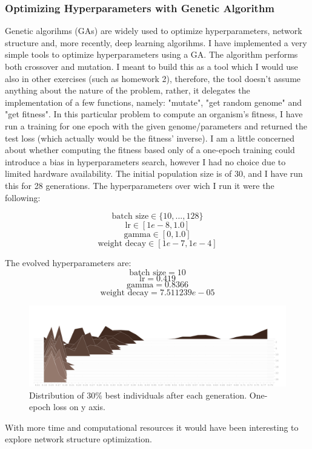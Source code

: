 \documentclass{article}
\begin{document}
\subsubsection{Optimizing Hyperparameters with Genetic Algorithm}
Genetic algorihms (GAs) are widely used to optimize hyperparameters, network structure and, more recently, deep learning algorihms. I have implemented a very simple tools to optimize hyperparameters using a GA. The algorithm performs both crossover and mutation. I meant to build this as a tool which I would use also in other exercises (such as homework 2), therefore, the tool doesn't assume anything about the nature of the problem, rather, it delegates the implementation of a few functions, namely: "mutate", "get random genome" and "get fitness". In this particular problem to compute an organism's fitness, I have run a training for one epoch with the given genome/parameters and returned the test loss (which actually would be the fitness' inverse). I am a little concerned about whether computing the fitness based only of a one-epoch training could introduce a bias in hyperparameters search, however I had no choice due to limited hardware availability.
The initial population size is of 30, and I have run this for 28 generations. The hyperparameters over wich I run it were the following:

$$
\textrm{batch size} \in \{10,...,128\}
$$
$$
\textrm{lr} \in [1e-8, 1.0]
$$
$$
\textrm{gamma} \in [0, 1.0]
$$
$$
\textrm{weight decay} \in [1e-7, 1e-4]
$$

The evolved hyperparameters are:
$$
\textrm{batch size} = 10
$$
$$
\textrm{lr} = 0.419
$$
$$
\textrm{gamma} =  0.8366
$$
$$
\textrm{weight decay} = 7.511239e-05
$$

\begin{figure}[H]
    \includegraphics[width=\linewidth]{mnist_task/imgs/genetic_population_2.png}
    \caption{Distribution of 30\% best individuals after each generation. One-epoch loss on y axis.}\label{best_fitness}
\end{figure}
With more time and computational resources it would have been interesting to explore network structure optimization.
\end{document}
